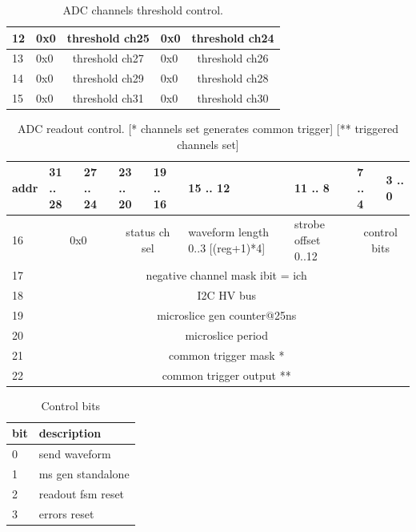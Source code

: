 \documentclass{article}
\begin{document}
\begin{table}[H]
\begin{tabular}{| l | l | l | l | l | l | l | l | l | l | l |}
12 & 0x0 & \multicolumn{4}{c|}{threshold ch25} & 0x0 & \multicolumn{4}{c|}{threshold ch24} \\ \hline
13 & 0x0 & \multicolumn{4}{c|}{threshold ch27} & 0x0 & \multicolumn{4}{c|}{threshold ch26} \\ \hline
14 & 0x0 & \multicolumn{4}{c|}{threshold ch29} & 0x0 & \multicolumn{4}{c|}{threshold ch28} \\ \hline
15 & 0x0 & \multicolumn{4}{c|}{threshold ch31} & 0x0 & \multicolumn{4}{c|}{threshold ch30} \\ \hline
\end{tabular}
\caption{ADC channels threshold control.\label{tab4}}
\end{table}

\begin{table}[H]
\centering
\begin{tabular}{| l | l | l | l | l | l | l | l | l |}
\hline
addr & 31 .. 28 & 27 .. 24 & 23 .. 20 & 19 .. 16 & 15 .. 12 & 11 .. 8 & 7 .. 4 & 3 .. 0 \\ \hline
16 & \multicolumn{2}{c|}{0x0} & \multicolumn{2}{c|}{status ch sel} & waveform length 0..3 [(reg+1)*4] & strobe offset 0..12 & \multicolumn{2}{c|}{control bits} \\ \hline
17 & \multicolumn{8}{c|}{negative channel mask ibit = ich} \\ \hline
18 & \multicolumn{8}{c|}{I2C HV bus} \\ \hline
19 & \multicolumn{8}{c|}{microslice gen counter@25ns} \\ \hline
20 & \multicolumn{8}{c|}{microslice period} \\ \hline
21 & \multicolumn{8}{c|}{common trigger mask *} \\ \hline
22 & \multicolumn{8}{c|}{common trigger output **} \\ \hline
\end{tabular}
\caption{ADC readout control. [* channels set generates common trigger] [** triggered channels set]\label{tab5}}
\end{table}

\begin{table}[H]
\centering
\begin{tabular}{| l | l |}
\hline
bit & description \\ \hline
0 & send waveform \\ \hline
1 & ms gen standalone \\ \hline
2 & readout fsm reset \\ \hline
3 & errors reset \\ \hline
\end{tabular}
\caption{Control bits\label{tab6}}
\end{table}
\end{document}

